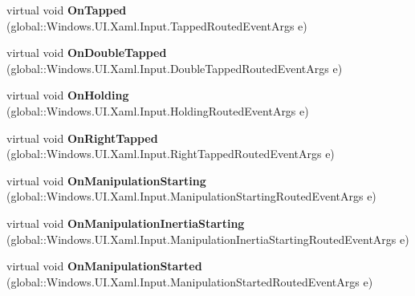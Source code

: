 \begin{DoxyCompactItemize}
virtual void {\bfseries On\+Tapped} (global\+::\+Windows.\+U\+I.\+Xaml.\+Input.\+Tapped\+Routed\+Event\+Args e)
\item 
\mbox{\label{class_windows_1_1_u_i_1_1_xaml_1_1_controls_1_1_control_a3e02cbf66e1030379acbcae595e718b7}} 
virtual void {\bfseries On\+Double\+Tapped} (global\+::\+Windows.\+U\+I.\+Xaml.\+Input.\+Double\+Tapped\+Routed\+Event\+Args e)
\item 
\mbox{\label{class_windows_1_1_u_i_1_1_xaml_1_1_controls_1_1_control_a8cceeae67a7b01f8f18f30b0e6cf83c6}} 
virtual void {\bfseries On\+Holding} (global\+::\+Windows.\+U\+I.\+Xaml.\+Input.\+Holding\+Routed\+Event\+Args e)
\item 
\mbox{\label{class_windows_1_1_u_i_1_1_xaml_1_1_controls_1_1_control_addc7255a46f490ec04cc165962614c99}} 
virtual void {\bfseries On\+Right\+Tapped} (global\+::\+Windows.\+U\+I.\+Xaml.\+Input.\+Right\+Tapped\+Routed\+Event\+Args e)
\item 
\mbox{\label{class_windows_1_1_u_i_1_1_xaml_1_1_controls_1_1_control_a967a18b3578c9d2bd19a72f4a964d3a3}} 
virtual void {\bfseries On\+Manipulation\+Starting} (global\+::\+Windows.\+U\+I.\+Xaml.\+Input.\+Manipulation\+Starting\+Routed\+Event\+Args e)
\item 
\mbox{\label{class_windows_1_1_u_i_1_1_xaml_1_1_controls_1_1_control_a435a48ffc2e72a28d5a8c492fb75ee38}} 
virtual void {\bfseries On\+Manipulation\+Inertia\+Starting} (global\+::\+Windows.\+U\+I.\+Xaml.\+Input.\+Manipulation\+Inertia\+Starting\+Routed\+Event\+Args e)
\item 
\mbox{\label{class_windows_1_1_u_i_1_1_xaml_1_1_controls_1_1_control_aed97aaca4691b6260b928885e95b59a3}} 
virtual void {\bfseries On\+Manipulation\+Started} (global\+::\+Windows.\+U\+I.\+Xaml.\+Input.\+Manipulation\+Started\+Routed\+Event\+Args e)
\item 
\mbox{\label{class_windows_1_1_u_i_1_1_xaml_1_1_controls_1_1_control_ac8964a26bad230883f276d2a27377698}} 

\end{DoxyCompactItemize}
